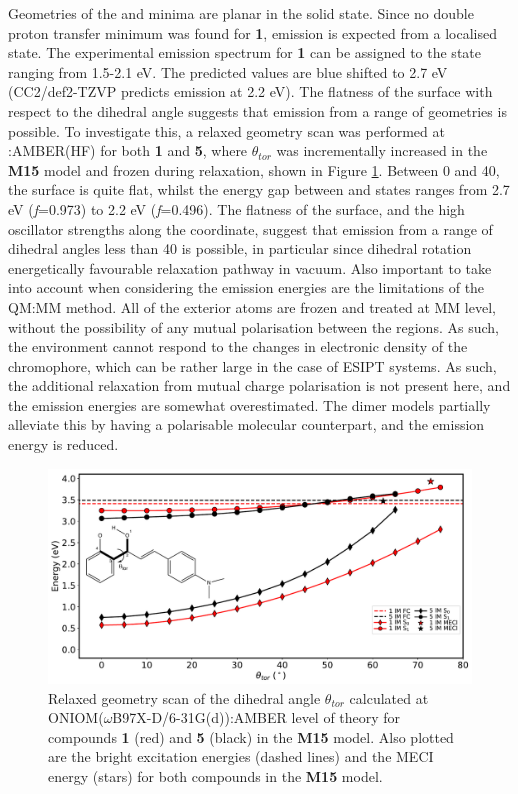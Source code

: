 Geometries of the \Estar{} and \Kstar{} minima are planar in the solid state. Since no double proton transfer \Kstar{} minimum was found for \textbf{1},  emission is expected from a localised \Kstar{} state. The experimental emission spectrum for \textbf{1} can be assigned to the \Kstar{} state ranging from 1.5-2.1 eV. The predicted values are blue shifted to 2.7 eV (CC2/def2-TZVP predicts emission at 2.2 eV). The flatness of the \sone{} surface with respect to the dihedral angle suggests that emission from a range of geometries is possible. To investigate this, a relaxed geometry scan was performed at \lowlevel:AMBER(HF) for both \textbf{1} and \textbf{5}, where $\theta_{tor}$ was incrementally increased in the \textbf{M15} model and frozen during relaxation, shown in Figure \ref{figure: HC_Oniom_Scan}. Between 0 and 40{\textdegree}, the \sone{} surface is quite flat, whilst the energy gap between \sone{} and \szero{} states ranges from 2.7 eV (\textit{f}=0.973) to 2.2 eV (\textit{f}=0.496). The flatness of the surface, and the high oscillator strengths along the coordinate, suggest that emission from a range of dihedral angles less than 40{\textdegree} is possible, in particular since dihedral rotation energetically favourable relaxation pathway in vacuum. Also important to take into account when considering the emission energies are the limitations of the QM:MM method. All of the exterior atoms are frozen and treated at MM level, without the possibility of any mutual polarisation between the regions. As such, the environment cannot respond to the changes in electronic density of the chromophore, which can be rather large in the case of ESIPT systems. As such, the additional relaxation from mutual charge polarisation is not present here, and the emission energies are somewhat overestimated. The dimer models partially alleviate this by having a polarisable molecular counterpart, and the emission energy is reduced. 

\begin{figure}[t]
\centering
  \includegraphics[width=0.8\linewidth]{4IntraInterInteractions/HC_Oniom_Scan.pdf}
  \caption[Relaxed geometry scan in the crystal]{Relaxed geometry scan of the dihedral angle $\theta_{tor}$ calculated at ONIOM($\omega$B97X-D/6-31G(d)):AMBER level of theory for compounds \textbf{1} (red) and \textbf{5} (black) in the \textbf{M15} model. Also plotted are the bright excitation energies (dashed lines) and the MECI energy (stars) for both compounds in the \textbf{M15} model.}
  \label{figure: HC_Oniom_Scan}
\end{figure}

